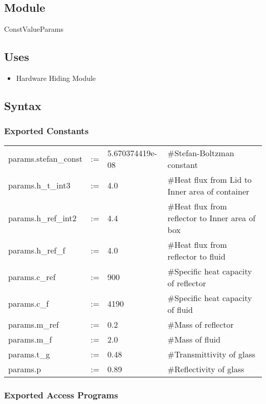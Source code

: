 \documentclass[12pt, titlepage]{article}
\begin{document}
\subsection{Module}

ConstValueParams

\subsection{Uses}
\begin{itemize}
\item Hardware Hiding Module
\end{itemize}

\subsection{Syntax}

\subsubsection{Exported Constants}
\begin{center}
\begin{tabular}{p{3.3cm} p{0.2cm} p{3cm} p{7cm}}
params.stefan\_const & := & 5.670374419e-08 & \#Stefan-Boltzman constant\\
params.h\_t\_int3 & := & 4.0 & \#Heat flux from Lid to Inner area of container\\
params.h\_ref\_int2 & := & 4.4 & \#Heat flux from reflector to Inner area of box \\ 
params.h\_ref\_f & := & 4.0 & \#Heat flux from reflector to fluid \\
params.c\_ref & := & 900 & \#Specific heat capacity of reflector \\
params.c\_f & := & 4190 & \#Specific heat capacity of fluid \\
params.m\_ref & := & 0.2 & \#Mass of reflector \\
params.m\_f & := & 2.0 & \#Mass of fluid \\
params.t\_g & := & 0.48 & \#Transmittivity of glass \\ 
params.p & := & 0.89 & \#Reflectivity of glass \\ 
\end{tabular}
\end{center}

\subsubsection{Exported Access Programs}
\end{document}
